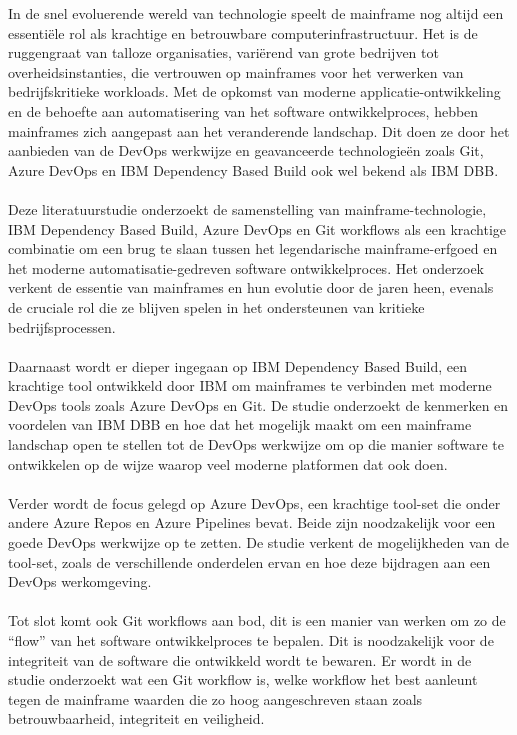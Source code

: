 In de snel evoluerende wereld van technologie speelt de mainframe nog altijd een essentiële rol als krachtige en betrouwbare computerinfrastructuur. Het is de ruggengraat van talloze organisaties, variërend van grote bedrijven tot overheidsinstanties, die vertrouwen op mainframes voor het verwerken van bedrijfskritieke workloads. Met de opkomst van moderne applicatie-ontwikkeling en de behoefte aan automatisering van het software ontwikkelproces, hebben mainframes zich aangepast aan het veranderende landschap. Dit doen ze door het aanbieden van de DevOps werkwijze en geavanceerde technologieën zoals Git, Azure DevOps en IBM Dependency Based Build ook wel bekend als IBM DBB.
\\ \\
Deze literatuurstudie onderzoekt de samenstelling van mainframe-technologie, IBM Dependency Based Build, Azure DevOps en Git workflows als een krachtige combinatie om een brug te slaan tussen het legendarische mainframe-erfgoed en het moderne automatisatie-gedreven software ontwikkelproces. Het onderzoek verkent de essentie van mainframes en hun evolutie door de jaren heen, evenals de cruciale rol die ze blijven spelen in het ondersteunen van kritieke bedrijfsprocessen.
\\ \\
Daarnaast wordt er dieper ingegaan op IBM Dependency Based Build, een krachtige tool ontwikkeld door IBM om mainframes te verbinden met moderne DevOps tools zoals Azure DevOps en Git. De studie onderzoekt de kenmerken en voordelen van IBM DBB en hoe dat het mogelijk maakt om een mainframe landschap open te stellen tot de DevOps werkwijze om op die manier software te ontwikkelen op de wijze waarop veel moderne platformen dat ook doen.
\\ \\
Verder wordt de focus gelegd op Azure DevOps, een krachtige tool-set die onder andere Azure Repos en Azure Pipelines bevat. Beide zijn noodzakelijk voor een goede DevOps werkwijze op te zetten. De studie verkent de mogelijkheden van de tool-set, zoals de verschillende onderdelen ervan en hoe deze bijdragen aan een DevOps werkomgeving.
\\ \\
Tot slot komt ook Git workflows aan bod, dit is een manier van werken om zo de ``flow'' van het software ontwikkelproces te bepalen. Dit is noodzakelijk voor de integriteit van de software die ontwikkeld wordt te bewaren. Er wordt in de studie onderzoekt wat een Git workflow is, welke workflow het best aanleunt tegen de mainframe waarden die zo hoog aangeschreven staan zoals betrouwbaarheid, integriteit en veiligheid.
\\ \\
